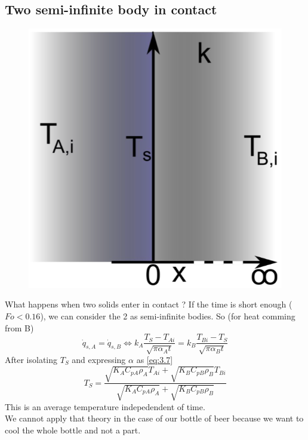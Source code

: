 	\subsection{Two semi-infinite body in contact}
		\begin{figure}
		\vspace{-5mm}
		\includegraphics[scale=0.3]{ch4/5}
		\end{figure}	
		What happens when two solids enter in contact ? If the time is short enough ($Fo < 0.16$), we can consider the 2 as semi-infinite bodies. So (for heat comming from B)
		\begin{equation}
			\dot{q}_{s,A} = \dot{q}_{s,B} \Leftrightarrow k_A \frac{T_S-T_{Ai}}{\sqrt{\pi \alpha _A t}} = k_B \frac{T_{Bi}-T_S}{\sqrt{\pi \alpha _B t}}
		\end{equation}
		After isolating $T_S$ and expressing $\alpha$ as \autoref{eq:3.7}
		\begin{equation}
			T_S = \frac{\sqrt{K_A C_{pA}\rho _A}T_{Ai} +\sqrt{K_B C_{pB}\rho _B}T_{Bi}}{\sqrt{K_A C_{pA}\rho _A}+\sqrt{K_B C_{pB}\rho _B}}
		\end{equation}
		This is an average temperature indepedendent of time. \\
		We cannot apply that theory in the case of our bottle of beer because we want to cool the whole bottle and not a part.
		
